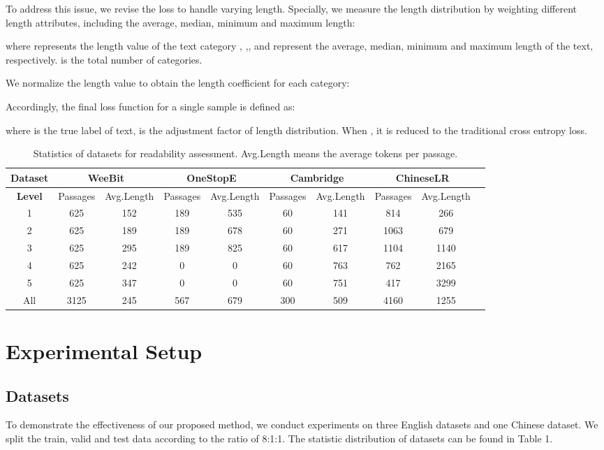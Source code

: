 \documentclass[11pt]{article}
\begin{document}
To address this issue, we revise the loss to handle varying length.
Specially, we measure the length distribution by weighting different length attributes, including the average, median, minimum and maximum length: 


where  represents the length value of the text category ,  ,,  and  represent the average, median, minimum and maximum length of the  text, respectively.  is the total number of categories.


We normalize the length value to obtain the length coefficient for each category:



Accordingly, the final loss function for a single sample is defined as:

where  is the true label of text,  is the adjustment factor of length distribution. When , it is reduced to the traditional cross entropy loss.


\begin{table*}[htbp]
\centering
\small
\begin{tabular}{cccccccccc}
\hline
\textbf{Dataset} & \multicolumn{2}{c}{\textbf{WeeBit}} & \multicolumn{2}{c}{\textbf{OneStopE}} & \multicolumn{2}{c}{\textbf{Cambridge}} & \multicolumn{2}{c}{\textbf{ChineseLR}} \\
\hline
\textbf{Level} & Passages    & Avg.Length    & Passages          & Avg.Length          & Passages           & Avg.Length          & Passages & \multicolumn{1}{c}{Avg.Length} \\
\hline
1 & 625 & 152 & 189 & 535 & 60 & 141 & 814 & 266 \\
2 & 625 & 189 & 189 & 678 & 60 & 271 & 1063 & 679 \\
3 & 625 & 295 & 189 & 825 & 60 & 617 & 1104 & 1140 \\
4 & 625 & 242 & 0  & 0  & 60 & 763 & 762 & 2165 \\
5 & 625 & 347 & 0  & 0  & 60 & 751 & 417 & 3299 \\
All & 3125 & 245 & 567 & 679 & 300 & 509 & 4160 & 1255 \\
\hline
\end{tabular}
\caption{Statistics of datasets for readability assessment. Avg.Length means the average tokens per passage.}
\end{table*}

\section{Experimental Setup}
\subsection{Datasets}
To demonstrate the effectiveness of our proposed method, we conduct experiments on three English datasets and one Chinese dataset. We split the train, valid and test data according to the ratio of 8:1:1. The statistic distribution of datasets can be found in Table 1.
\end{document}
